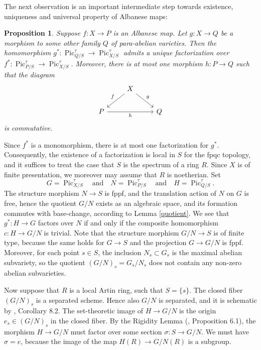 \documentclass[oneside, 12pt]{amsart}
\newcommand\mylabel[1]{\label{#1}\marginpar{\raggedright\vspace{-1ex}\medskip\medskip\footnotesize \tt #1}}
\renewcommand\mylabel[1]{\label{#1}}
\newtheorem{proposition}[theorem]{Proposition}
\theoremstyle{definition}
\theoremstyle{remark}
\newcommand{\Pic}{\operatorname{Pic}}
\newcommand{\quadand}{\quad\text{and}\quad}
\newcommand{\ra}{\rightarrow}
\begin{document}
\medskip
The next observation is an important intermediate step towards existence, uniqueness and universal property of Albanese maps:

\begin{proposition}
\mylabel{weak uniqueness}
Suppose $f:X\ra P$ is an Albanese map. Let $g:X\ra Q$ be a morphism to some other family $Q$ of para-abelian varieties.
Then the homomorphism $g^*:\Pic^\tau_{Q/S}\ra\Pic^\tau_{X/S}$ admits  a unique factorization over $f^*:\Pic^\tau_{P/S}\ra\Pic^\tau_{X/S}$.
Moreover, there is at most one morphism  $h:P\ra Q$ such that the diagram
\begin{equation}
\label{maps to para-abelian}
\begin{tikzcd} 
                & X\ar[dl,"f"']\ar[dr,"g"]\\
P\ar[rr,"h"']    &                           &Q
\end{tikzcd}
\end{equation}
is commutative.
\end{proposition}

\proof 
Since $f^*$ is a monomorphism, there is at most one  factorization for $g^*$.  
Consequently, the existence of a factorization is   local in $S$ for the fpqc topology,  and it suffices to treat the
case that $S$ is the spectrum of a ring $R$. Since $X$ is of finite presentation, we moreover
may assume that $R$ is noetherian.
Set
$$
G=\Pic^\tau_{X/S}\quadand N=\Pic^\tau_{P/S}\quadand H=\Pic^\tau_{Q/S}.
$$
The structure morphism  $N\ra S$ is fppf, and the  translation action of $N$
on $G$ is free, hence the quotient $G/N$ exists as an algebraic space, and its formation commutes with base-change,
according to Lemma  \ref{quotient}.
We see that $g^*:H\ra G$ factors over $N$ if and only
if the composite homomorphism $c:H\ra G/N$ is trivial.  
Note that the structure morphism $G/N\ra S$ is of finite type, because the same
holds for $G\ra S$  and the projection $G\ra G/N$ is   fppf.
Moreover, for each point $s\in S$, the inclusion $N_s\subset G_s$ is the maximal abelian subvariety, so the quotient $(G/N)_s=G_s/N_s$ does not contain
any  non-zero abelian subvarieties.

Now suppose that $R$ is a    local Artin ring, such that $S=\{s\}$. The closed fiber  $(G/N)_s$ is a separated scheme. Hence also $G/N$ is separated,
and it is schematic by \cite{Rydh 2015},  Corollary 8.2. 
The set-theoretic image of  $H\ra G/N$ is the origin   $e_s\in (G/N)_s$ in the closed fiber.
By the Rigidity Lemma (\cite{Mumford; Fogarty; Kirwan 1993}, Proposition 6.1), the morphism $H\ra G/N$ must factor over some section $\sigma:S\ra G/N$.
We must have $\sigma=e$, because the image  of the map  $H(R)\ra G/N(R)$ is a  subgroup. 
\end{document}
